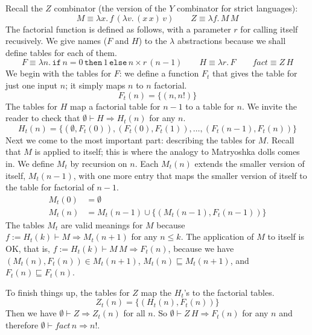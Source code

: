\documentclass{tufte-handout}
\newcommand{\LAM}[1]{\lambda #1.\,}
\newcommand{\APP}[0]{\,}
\newcommand{\IF}[3]{\mathtt{if}\,#1\,\mathtt{then}\,#2\,\mathtt{else}\,#3}
\begin{document}
Recall the $Z$ combinator (the version of the $Y$ combinator for
strict languages):
\[
  M  \equiv \LAM{x} f \APP (\LAM{v} (x\APP x) \APP v) \qquad
  Z  \equiv \LAM{f} M \APP M 
\]
The factorial function is defined as follows, with a parameter $r$ for
calling itself recusively. We give names ($F$ and $H$) to the
$\lambda$ abstractions because we shall define tables for each of
them.
\[
  F  \equiv \LAM{n} \IF{n=0}{1}{n} \times r \APP (n-1) \qquad
  H \equiv \LAM{r} F \qquad
  \mathit{fact} \equiv Z\APP H
\]
We begin with the tables for $F$: we define a function $F_t$ that
gives the table for just one input $n$; it simply maps $n$ to $n$
factorial.
\[
  F_t(n) = \{ (n,n!) \}
\]
The tables for $H$ map a factorial table for $n-1$ to a table for $n$.
We invite the reader to check that
$\emptyset \vdash H \Rightarrow H_t(n)$ for any $n$.
\[
H_t(n) = \{ (\emptyset, F_t(0)), (F_t(0), F_t(1)), \ldots, (F_t(n-1), F_t(n))\}
\]
Next we come to the most important part: describing the tables for
$M$. Recall that $M$ is applied to itself; this is where the
analogy to Matryoshka dolls comes in.  We define $M_t$ by recursion on
$n$. Each $M_t(n)$ extends the smaller version of itself, $M_t(n-1)$,
with one more entry that maps the smaller version of itself to the
table for factorial of $n-1$.
\begin{align*}
  M_t(0) &= \emptyset \\
  M_t(n) &= M_t(n-1) \cup \{ (M_t(n-1), F_t(n-1)) \}
\end{align*}
The tables $M_t$ are valid meanings for $M$ because $f{:=}H_t(k)
\vdash M \Rightarrow M_t(n+1)$ for any $n \leq k$.
The application of $M$ to itself is OK, that is,
$f{:=}H_t(k) \vdash M\APP M \Rightarrow F_t(n)$,
because we have
$(M_t(n),F_t(n)) \in M_t(n+1)$, 
$M_t(n)\sqsubseteq M_t(n+1)$, and
$F_t(n) \sqsubseteq F_t(n)$.

To finish things up, the tables for $Z$ map the $H_t$'s to the
factorial tables.
\[
  Z_t(n) = \{ (H_t(n), F_t(n)) \}
\]
Then we have $\emptyset \vdash Z \Rightarrow Z_t(n)$ for all $n$.  So
$\emptyset \vdash Z\APP H \Rightarrow F_t(n)$ for any $n$ and
therefore $\emptyset \vdash \mathit{fact}\,n \Rightarrow n!$.
\end{document}
